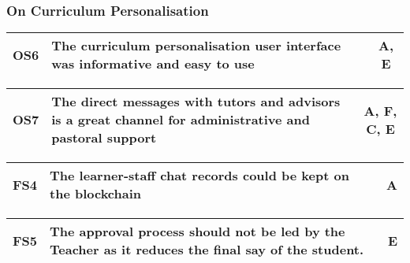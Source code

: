 \subsubsection{On Curriculum Personalisation}

\begin{table}[!ht]
	\begin{tabularx}{\textwidth}{|c|X|c|}
		\hline
		OS6 & \textbf{The curriculum personalisation user interface was informative and easy to use} & A, E                 \\
		\hline
	\end{tabularx}
\end{table}

\begin{table}[!ht]
	\begin{tabularx}{\textwidth}{|c|X|c|}
		\hline
		OS7 & \textbf{The direct messages with tutors and advisors is a great channel for administrative and pastoral support} & A, F, C, E                 \\
		\hline
	\end{tabularx}
\end{table}

\begin{table}[!ht]
	\begin{tabularx}{\textwidth}{|c|X|c|}
		\hline
		FS4 & \textbf{The learner-staff chat records could be kept on the blockchain} & A\\
		\hline
	\end{tabularx}
\end{table}

\begin{table}[!ht]
	\begin{tabularx}{\textwidth}{|c|X|c|}
		\hline
		FS5 & \textbf{The approval process should not be led by the Teacher as it reduces the final say of the student.} & E\\
		\hline
	\end{tabularx}
\end{table}

